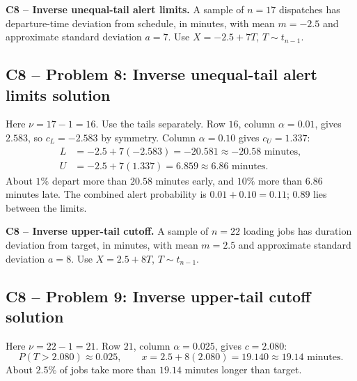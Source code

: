 {
\textbf{C8 -- Inverse unequal-tail alert limits.} A sample of $n=17$ dispatches has departure-time deviation from schedule, in minutes, with mean $m=-2.5$ and approximate standard deviation $a=7$. Use $X=-2.5+7T$, $T\sim t_{n-1}$.
\label{sol:q8}
\subsection*{C8 -- Problem 8: Inverse unequal-tail alert limits solution }
Here $\nu=17-1=16$. Use the tails separately.
Row $16$, column $\alpha=0.01$, gives $2.583$, so $c_L=-2.583$ by symmetry.
Column $\alpha=0.10$ gives $c_U=1.337$:
\[
 \begin{aligned}
 L&=-2.5+7(-2.583)=-20.581\approx\boxed{-20.58\text{ minutes}},\\
 U&=-2.5+7(1.337)=6.859\approx\boxed{6.86\text{ minutes}}.
 \end{aligned}
\]
About $1\%$ depart more than $20.58$ minutes early, and $10\%$ more than $6.86$ minutes late.
The combined alert probability is $0.01+0.10=0.11$; $0.89$ lies between the limits.
\secInicio[sec:q8]
}

{
\textbf{C8 -- Inverse upper-tail cutoff.} A sample of $n=22$ loading jobs has duration deviation from target, in minutes, with mean $m=2.5$ and approximate standard deviation $a=8$. Use $X=2.5+8T$, $T\sim t_{n-1}$.
\label{sol:q9}
\subsection*{C8 -- Problem 9: Inverse upper-tail cutoff solution }
Here $\nu=22-1=21$. Row $21$, column $\alpha=0.025$, gives $c=2.080$:
\[
 P(T>2.080)\approx0.025,\qquad
 x=2.5+8(2.080)=19.140\approx\boxed{19.14\text{ minutes}}.
\]
About $2.5\%$ of jobs take more than $19.14$ minutes longer than target.
\secInicio[sec:q9]
}

